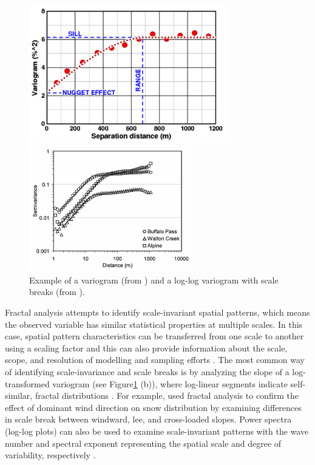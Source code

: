 \documentclass{sfuthesis}
\begin{document}
\begin{figure}
\begin{minipage}[c][8cm][t]{.58\textwidth}
        \vspace*{\fill}
  \centering
  \includegraphics[height=6cm]{variogram.png}
\end{minipage}%
\begin{minipage}[c][8cm][t]{.38\textwidth}
        \vspace*{\fill} 
          \centering
         \includegraphics[height=5.5cm]{loglogvario.png}
  \end{minipage}%

\caption{Example of a variogram (from \cite{Srivastava2013}) and a log-log variogram with scale breaks (from \cite{Deems2006a}).}
\label{variogram}
\end{figure}

Fractal analysis attempts to identify scale-invariant spatial patterns, which means the observed variable has similar statistical properties at multiple scales. In this case, spatial pattern characteristics can be transferred from one scale to another using a scaling factor and this can also provide information about the scale, scope, and resolution of modelling and sampling efforts \citep{Deems2006a}. The most common way of identifying scale-invariance and scale breaks is by analyzing the slope of a log-transformed variogram (see Figure\ref{variogram} (b)), where log-linear segments indicate self-similar, fractal distributions \citep{Deems2006a}. For example, \cite{Schirmer2011a} used fractal analysis to confirm the effect of dominant wind direction on snow distribution by examining differences in scale break between windward, lee, and cross-loaded slopes. Power spectra (log-log plots) can also be used to examine scale-invariant patterns with the wave number and spectral exponent representing the spatial scale and degree of variability, respectively \citep{Trujillo2007, Trujillo2009}.
\end{document}
